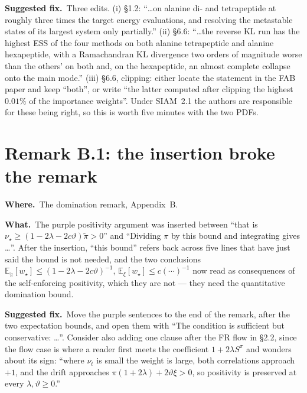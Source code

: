 \documentclass[11pt]{article}
\newcommand{\E}{\mathbb E}
\newcommand{\Le}{\leqslant}
\newcommand{\Ge}{\geqslant}
\newcommand{\where}[1]{\smallskip\noindent\textbf{Where.}\ #1\par}
\newcommand{\what}[1]{\smallskip\noindent\textbf{What.}\ #1\par}
\newcommand{\fix}[1]{\smallskip\noindent\textbf{Suggested fix.}\ #1\par}
\begin{document}
\fix{Three edits. (i) \S1.2: ``\dots on alanine di- and tetrapeptide at
roughly three times the target energy evaluations, and resolving the metastable
states of its largest system only partially.'' (ii) \S6.6: ``\dots the reverse
KL run has the highest ESS of the four methods on both alanine tetrapeptide and
alanine hexapeptide, with a Ramachandran KL divergence two orders of magnitude
worse than the others' on both and, on the hexapeptide, an almost complete
collapse onto the main mode.'' (iii) \S6.6, clipping: either locate the
statement in the FAB paper and keep ``both'', or write ``the latter computed
after clipping the highest $0.01\%$ of the importance weights''. Under
SIAM~2.1 the authors are responsible for these being right, so this is worth
five minutes with the two PDFs.}

\section{Remark B.1: the insertion broke the remark}
\label{sec:remB1}

\where{The domination remark, Appendix~B.}

\what{The purple positivity argument was inserted between ``that is
$\nu_\star\Ge(1-2\lambda-2c\vartheta)\tilde\pi>0$'' and ``Dividing $\pi$ by
this bound and integrating gives \dots''. After the insertion, ``this bound''
refers back across five lines that have just said the bound is not needed, and
the two conclusions $\E_{\tilde\pi}[w_\star]\Le(1-2\lambda-2c\vartheta)^{-1}$,
$\E_\xi[w_\star]\Le c(\cdots)^{-1}$ now read as consequences of the
self-enforcing positivity, which they are not --- they need the quantitative
domination bound.}

\fix{Move the purple sentences to the end of the remark, after the two
expectation bounds, and open them with ``The condition is sufficient but
conservative: \dots''. Consider also adding one clause after the FR flow in
\S2.2, since the flow case is where a reader first meets the coefficient
$1+2\lambda S^\pi$ and wonders about its sign: ``where $\nu_t$ is small the
weight is large, both correlations approach $+1$, and the drift approaches
$\pi(1+2\lambda)+2\vartheta\xi>0$, so positivity is preserved at every
$\lambda,\vartheta\Ge0$.''}

\end{document}
